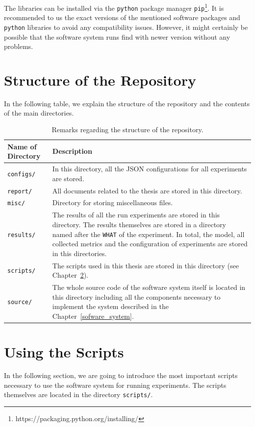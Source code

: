The libraries can be installed via the \texttt{python} package manager \texttt{pip}\footnote{https://packaging.python.org/installing/}. It is recommended to us the exact versions of the mentioned software packages and \texttt{python} libraries to avoid any compatibility issues. However, it might certainly be possible that the software system runs find with newer version without any problems.

\clearpage
\section{Structure of the Repository}
In the following table, we explain the structure of the repository and the contents of the main directories.

\begin{table}[H]
	\centering
	\begin{tabularx}{\textwidth}{lX}
		\toprule
		Name of Directory & Description\\ \midrule
		\texttt{configs/} & In this directory, all the JSON configurations for all experiments are stored.\\
		\texttt{report/} & All documents related to the thesis are stored in this directory.\\
		\texttt{misc/} & Directory for storing miscellaneous files.\\
		\texttt{results/} & The results of all the run experiments are stored in this directory. The results themselves are stored in a directory named after the \texttt{WHAT} of the experiment. In total, the model, all collected metrics and the configuration of experiments are stored in this directories.\\
		\texttt{scripts/} & The scripts used in this thesis are stored in this directory (see Chapter~\ref{software_usage:using_scripts}).\\
		\texttt{source/} & The whole source code of the software system itself is located in this directory including all the components necessary to implement the system described in the Chapter~\ref{sofware_system}.\\
		\bottomrule
	\end{tabularx}
	\caption{Remarks regarding the structure of the repository.}
\end{table}

\clearpage
\section{Using the Scripts}
\label{software_usage:using_scripts}
In the following section, we are going to introduce the most important scripts necessary to use the software system for running experiments. The scripts themselves are located in the directory \texttt{scripts/}.

